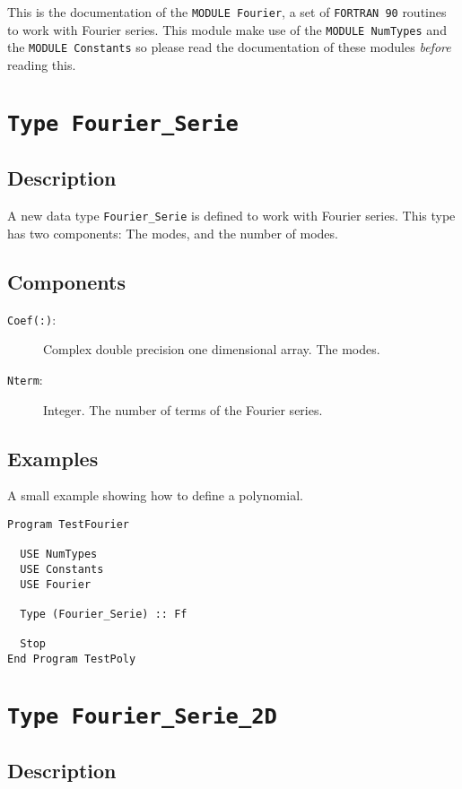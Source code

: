 This is the documentation of the \texttt{MODULE Fourier}, a set
of \texttt{FORTRAN 90} routines to work with Fourier series. This
module make use of the \texttt{MODULE NumTypes} and the
\texttt{MODULE Constants} so please read the documentation of these
modules \emph{before} reading this. 

\section{\texttt{Type Fourier\_Serie}}

\subsection{Description}

A new data type \texttt{Fourier\_Serie} is defined to work with
Fourier series. This type has two components: The modes, and the
number of modes.

\subsection{Components}

\begin{description}
\item[\texttt{Coef(:)}: ] Complex double precision one dimensional
  array. The modes.
\item[\texttt{Nterm}:] Integer. The number of terms of the Fourier
  series. 
\end{description}

\subsection{Examples}

A small example showing how to define a polynomial.

\begin{verbatim}
Program TestFourier

  USE NumTypes
  USE Constants
  USE Fourier

  Type (Fourier_Serie) :: Ff

  Stop
End Program TestPoly
\end{verbatim}

\section{\texttt{Type Fourier\_Serie\_2D}}

\subsection{Description}

